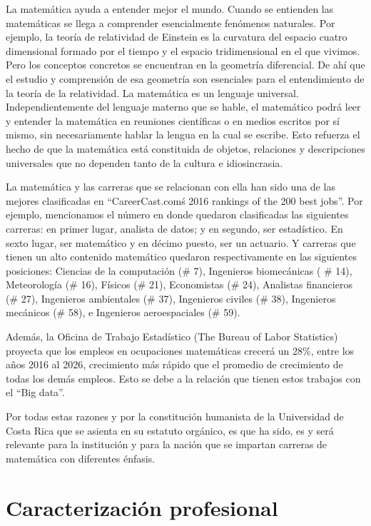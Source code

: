 La matemática ayuda a entender mejor el mundo.  Cuando se entienden las matemáticas se llega a comprender esencialmente fenómenos naturales. Por ejemplo, la teoría de relatividad de Einstein es la curvatura del espacio cuatro dimensional formado por el tiempo y el espacio tridimensional en el que vivimos.  Pero los conceptos concretos se encuentran en la geometría diferencial.  De ahí que el estudio y comprensión de esa geometría son esenciales para el entendimiento de la teoría de la relatividad. 
La matemática es un lenguaje universal.  Independientemente del lenguaje materno que se hable, el matemático podrá leer y entender la matemática en reuniones científicas o en medios escritos por sí mismo, sin necesariamente hablar la lengua en la cual se escribe. Esto refuerza el hecho de que la matemática está constituida de objetos, relaciones y descripciones universales que no dependen tanto de la cultura e idiosincrasia.  

La matemática y las carreras que se relacionan con ella han sido una de las mejores clasificadas en “CareerCast.com\'s 2016 rankings of the 200 best jobs”. Por ejemplo, mencionamos el número en donde quedaron clasificadas las siguientes carreras: en primer lugar, analista de datos; y en segundo, ser estadístico. En sexto lugar, ser matemático y en décimo puesto, ser un actuario. Y carreras que tienen un alto contenido matemático quedaron respectivamente en las siguientes posiciones: Ciencias de la computación (\# 7), Ingenieros biomecánicas ( \# 14), Meteorología (\# 16), Físicos (\# 21), Economistas (\# 24), Analistas financieros (\# 27), Ingenieros ambientales (\# 37), Ingenieros civiles (\# 38), Ingenieros mecánicos (\# 58), e Ingenieros aeroespaciales (\# 59). 

Además, la Oficina de Trabajo Estadístico (The Bureau of Labor Statistics) proyecta que los empleos en ocupaciones matemáticas crecerá un 28\%, entre los años 2016 al 2026, crecimiento más rápido que el promedio de crecimiento de todas los demás empleos. Esto se debe a la relación que tienen estos trabajos con el “Big data”. 

Por todas estas razones y por la constitución humanista de la Universidad de Costa Rica que se asienta en su estatuto orgánico, es que ha sido, es y será relevante para la institución y para la nación que se impartan carreras de matemática con diferentes énfasis.


\section{Caracterización profesional}

